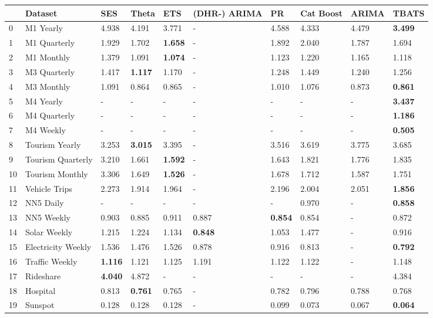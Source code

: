 \begin{tabular}{llllllllll}
\toprule
 & Dataset & SES & Theta & ETS & (DHR-) ARIMA & PR & Cat Boost & ARIMA & TBATS \\
\midrule
0 & M1 Yearly & 4.938 & 4.191 & 3.771 & - & 4.588 & 4.333 & 4.479 & \textbf{3.499} \\
1 & M1 Quarterly & 1.929 & 1.702 & \textbf{1.658} & - & 1.892 & 2.040 & 1.787 & 1.694 \\
2 & M1 Monthly & 1.379 & 1.091 & \textbf{1.074} & - & 1.123 & 1.220 & 1.165 & 1.118 \\
3 & M3 Quarterly & 1.417 & \textbf{1.117} & 1.170 & - & 1.248 & 1.449 & 1.240 & 1.256 \\
4 & M3 Monthly & 1.091 & 0.864 & 0.865 & - & 1.010 & 1.076 & 0.873 & \textbf{0.861} \\
5 & M4 Yearly & - & - & - & - & - & - & - & \textbf{3.437} \\
6 & M4 Quarterly & - & - & - & - & - & - & - & \textbf{1.186} \\
7 & M4 Weekly & - & - & - & - & - & - & - & \textbf{0.505} \\
8 & Tourism Yearly & 3.253 & \textbf{3.015} & 3.395 & - & 3.516 & 3.619 & 3.775 & 3.685 \\
9 & Tourism Quarterly & 3.210 & 1.661 & \textbf{1.592} & - & 1.643 & 1.821 & 1.776 & 1.835 \\
10 & Tourism Monthly & 3.306 & 1.649 & \textbf{1.526} & - & 1.678 & 1.712 & 1.587 & 1.751 \\
11 & Vehicle Trips & 2.273 & 1.914 & 1.964 & - & 2.196 & 2.004 & 2.051 & \textbf{1.856} \\
12 & NN5 Daily & - & - & - & - & - & 0.970 & - & \textbf{0.858} \\
13 & NN5 Weekly & 0.903 & 0.885 & 0.911 & 0.887 & \textbf{0.854} & 0.854 & - & 0.872 \\
14 & Solar Weekly & 1.215 & 1.224 & 1.134 & \textbf{0.848} & 1.053 & 1.477 & - & 0.916 \\
15 & Electricity Weekly & 1.536 & 1.476 & 1.526 & 0.878 & 0.916 & 0.813 & - & \textbf{0.792} \\
16 & Traffic Weekly & \textbf{1.116} & 1.121 & 1.125 & 1.191 & 1.122 & 1.122 & - & 1.148 \\
17 & Rideshare & \textbf{4.040} & 4.872 & - & - & - & - & - & 4.384 \\
18 & Hospital & 0.813 & \textbf{0.761} & 0.765 & - & 0.782 & 0.796 & 0.788 & 0.768 \\
19 & Sunspot & 0.128 & 0.128 & 0.128 & - & 0.099 & 0.073 & 0.067 & \textbf{0.064} \\

\end{tabular}

